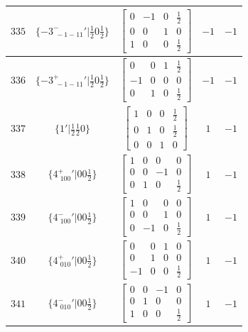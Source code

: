 \documentclass[fleqn,8pt]{jsarticle}
\begin{document}
\begin{longtable}{ccccc}
$ 335 $ & $ \{-3^{-}_{\,\,-1-11}{}'|\frac{1}{2} 0 \frac{1}{2}\} $ & $ \begin{bmatrix} 0 & -1 & 0 & \frac{1}{2} \\ 0 & 0 & 1 & 0 \\ 1 & 0 & 0 & \frac{1}{2} \end{bmatrix} $ & $ -1 $ & $ -1 $ \\ \hline
$ 336 $ & $ \{-3^{+}_{\,\,-1-11}{}'|\frac{1}{2} 0 \frac{1}{2}\} $ & $ \begin{bmatrix} 0 & 0 & 1 & \frac{1}{2} \\ -1 & 0 & 0 & 0 \\ 0 & 1 & 0 & \frac{1}{2} \end{bmatrix} $ & $ -1 $ & $ -1 $ \\ \hline
$ 337 $ & $ \{1{}'|\frac{1}{2} \frac{1}{2} 0\} $ & $ \begin{bmatrix} 1 & 0 & 0 & \frac{1}{2} \\ 0 & 1 & 0 & \frac{1}{2} \\ 0 & 0 & 1 & 0 \end{bmatrix} $ & $ 1 $ & $ -1 $ \\ \hline
$ 338 $ & $ \{4^{+}_{\,\,100}{}'|0 0 \frac{1}{2}\} $ & $ \begin{bmatrix} 1 & 0 & 0 & 0 \\ 0 & 0 & -1 & 0 \\ 0 & 1 & 0 & \frac{1}{2} \end{bmatrix} $ & $ 1 $ & $ -1 $ \\ \hline
$ 339 $ & $ \{4^{-}_{\,\,100}{}'|0 0 \frac{1}{2}\} $ & $ \begin{bmatrix} 1 & 0 & 0 & 0 \\ 0 & 0 & 1 & 0 \\ 0 & -1 & 0 & \frac{1}{2} \end{bmatrix} $ & $ 1 $ & $ -1 $ \\ \hline
$ 340 $ & $ \{4^{+}_{\,\,010}{}'|0 0 \frac{1}{2}\} $ & $ \begin{bmatrix} 0 & 0 & 1 & 0 \\ 0 & 1 & 0 & 0 \\ -1 & 0 & 0 & \frac{1}{2} \end{bmatrix} $ & $ 1 $ & $ -1 $ \\ \hline
$ 341 $ & $ \{4^{-}_{\,\,010}{}'|0 0 \frac{1}{2}\} $ & $ \begin{bmatrix} 0 & 0 & -1 & 0 \\ 0 & 1 & 0 & 0 \\ 1 & 0 & 0 & \frac{1}{2} \end{bmatrix} $ & $ 1 $ & $ -1 $ \\ \hline

\end{longtable}
\end{document}
